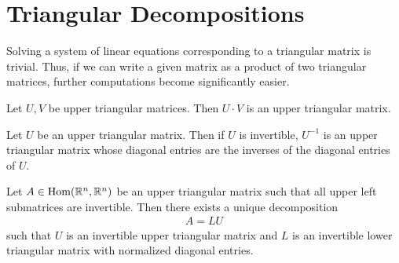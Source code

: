 \section{Triangular Decompositions}
Solving a system of linear equations corresponding to a triangular matrix is trivial. Thus, if we can write a given matrix as a product of two triangular matrices, further computations become significantly easier.
\begin{exercise}
	Let $U,V$ be upper triangular matrices. Then $U \cdot V$ is an upper triangular matrix. 
\end{exercise}
\begin{exercise}
	Let $U$ be an upper triangular matrix. Then if $U$ is invertible, $U^{-1}$ is an upper triangular matrix whose diagonal entries are the inverses of the diagonal entries of $U$.
\end{exercise}
\begin{theorem}
	Let $A \in \textnormal{Hom}(\mathbb{R}^n, \mathbb{R}^n)$ be an upper triangular matrix such that all upper left submatrices are invertible. Then there exists a unique decomposition 
	\begin{align*}
		A = L U
	\end{align*}
	such that $U$ is an invertible upper triangular matrix and $L$ is an invertible lower triangular matrix with normalized diagonal entries.
\end{theorem}

